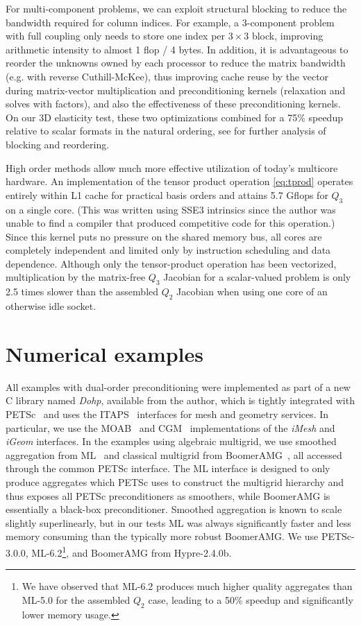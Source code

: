For multi-component problems, we can exploit structural blocking to reduce the bandwidth required for column indices.
For example, a 3-component problem with full coupling only needs to store one index per $3\times 3$ block, improving
arithmetic intensity to almost 1 flop / 4 bytes.  In addition, it is advantageous to reorder the unknowns owned by each
processor to reduce the matrix bandwidth (e.g. with reverse Cuthill-McKee), thus improving cache reuse by the vector
during matrix-vector multiplication and preconditioning kernels (relaxation and solves with factors), and also the
effectiveness of these preconditioning kernels.  On our 3D elasticity test, these two optimizations combined for a 75\%
speedup relative to scalar formats in the natural ordering, see \citet{gropp2000pmt} for further analysis of blocking and
reordering.

High order methods allow much more effective utilization of today's multicore hardware.  An implementation of the tensor
product operation \eqref{eq:tprod} operates entirely within L1 cache for practical basis orders and attains 5.7 Gflops
for $Q_3$ on a single core.  (This was written using SSE3 intrinsics since the author was unable to find a compiler that
produced competitive code for this operation.)  Since this kernel puts no pressure on the shared memory bus, all cores
are completely independent and limited only by instruction scheduling and data dependence.  Although only the
tensor-product operation has been vectorized, multiplication by the matrix-free $Q_3$ Jacobian for a scalar-valued
problem is only 2.5 times slower than the assembled $Q_2$ Jacobian when using one core of an otherwise idle socket.

\section{Numerical examples}\label{sec:examples}
All examples with dual-order preconditioning were implemented as part of a new C library named \emph{Dohp}, available
from the author, which is tightly integrated with PETSc~\citep{petsc-user-ref} and uses the ITAPS~\citep{itapsproject}
interfaces for mesh and geometry services.  In particular, we use the MOAB~\citep{moab} and CGM~\citep{cgm}
implementations of the \emph{iMesh} and \emph{iGeom} interfaces.  In the examples using algebraic multigrid, we use
smoothed aggregation from ML~\citep{ml-guide} and classical multigrid from BoomerAMG~\citep{henson2002bpa}, all accessed
through the common PETSc interface.  The ML interface is designed to only produce aggregates which PETSc uses to
construct the multigrid hierarchy and thus exposes all PETSc preconditioners as smoothers, while BoomerAMG is
essentially a black-box preconditioner.  Smoothed aggregation is known to scale slightly superlinearly, but in our tests
ML was always significantly faster and less memory consuming than the typically more robust BoomerAMG.  We use
PETSc-3.0.0, ML-6.2\footnote{We have observed that ML-6.2 produces much higher quality aggregates than ML-5.0 for the
  assembled $Q_2$ case, leading to a 50\% speedup and significantly lower memory usage.}, and BoomerAMG from
Hypre-2.4.0b.

